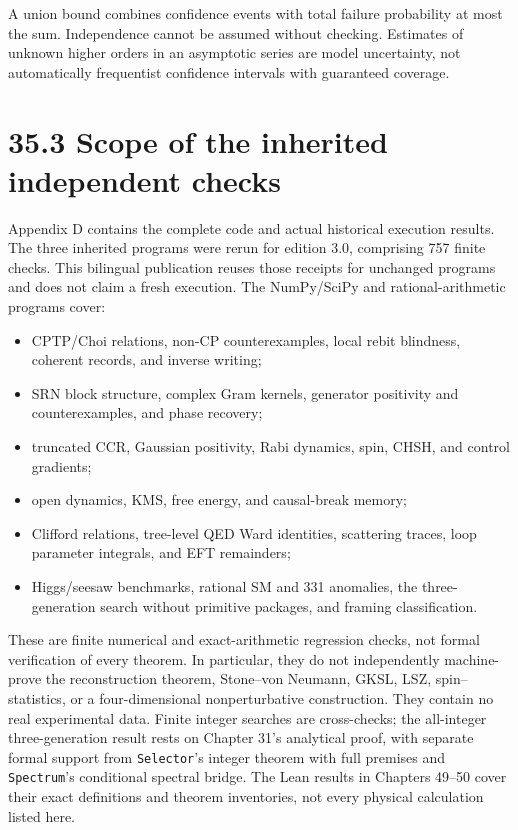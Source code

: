 \documentclass[
  11pt,
  oneside]{book}
\providecommand{\tightlist}{%
  \setlength{\itemsep}{0pt}\setlength{\parskip}{0pt}}
\begin{document}
A union bound combines confidence events with total failure probability
at most the sum. Independence cannot be assumed without checking.
Estimates of unknown higher orders in an asymptotic series are model
uncertainty, not automatically frequentist confidence intervals with
guaranteed coverage.

\section{35.3 Scope of the inherited independent checks}

Appendix D contains the complete code and actual historical execution
results. The three inherited programs were rerun for edition 3.0,
comprising 757 finite checks. This bilingual publication reuses those
receipts for unchanged programs and does not claim a fresh execution.
The NumPy/SciPy and rational-arithmetic programs cover:

\begin{itemize}
\tightlist
\item
  CPTP/Choi relations, non-CP counterexamples, local rebit blindness,
  coherent records, and inverse writing;
\item
  SRN block structure, complex Gram kernels, generator positivity and
  counterexamples, and phase recovery;
\item
  truncated CCR, Gaussian positivity, Rabi dynamics, spin, CHSH, and
  control gradients;
\item
  open dynamics, KMS, free energy, and causal-break memory;
\item
  Clifford relations, tree-level QED Ward identities, scattering traces,
  loop parameter integrals, and EFT remainders;
\item
  Higgs/seesaw benchmarks, rational SM and 331 anomalies, the
  three-generation search without primitive packages, and framing
  classification.
\end{itemize}

These are finite numerical and exact-arithmetic regression checks, not
formal verification of every theorem. In particular, they do not
independently machine-prove the reconstruction theorem, Stone--von
Neumann, GKSL, LSZ, spin--statistics, or a four-dimensional
nonperturbative construction. They contain no real experimental data.
Finite integer searches are cross-checks; the all-integer
three-generation result rests on Chapter 31's analytical proof, with
separate formal support from \texttt{Selector}'s integer theorem with
full premises and \texttt{Spectrum}'s conditional spectral bridge. The
Lean results in Chapters 49--50 cover their exact definitions and
theorem inventories, not every physical calculation listed here.
\end{document}

